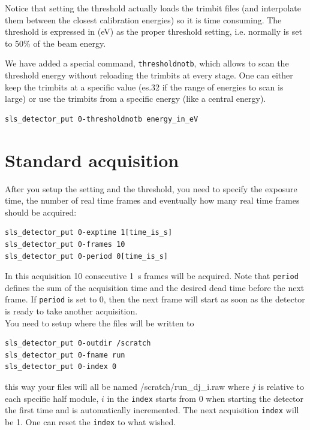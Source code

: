 \documentclass{article}
\begin{document}
Notice that setting the threshold actually loads the trimbit files (and interpolate them between the closest calibration energies) so it is time consuming. 
The threshold is expressed in (eV) as the proper threshold setting, i.e. normally is set to 50\% of the beam energy.  

We have added a special command, {\tt{thresholdnotb}}, which allows to scan the threshold energy without reloading the trimbits at every stage. One can either keep the trimbits at a specific value (es.32 if the range of energies to scan is large) or use the trimbits from a specific energy (like a central energy).
\begin{verbatim}
sls_detector_put 0-thresholdnotb energy_in_eV
\end{verbatim}

\section{Standard acquisition}

After you setup the setting and the threshold, you need to specify the exposure time, the number of real time frames and eventually how many real time frames should be acquired:
\begin{verbatim}
sls_detector_put 0-exptime 1[time_is_s]
sls_detector_put 0-frames 10
sls_detector_put 0-period 0[time_is_s]
\end{verbatim}
In this acquisition 10 consecutive 1~s frames will be acquired. Note that {\tt{period}} defines the sum of the acquisition time and the desired dead time before the next frame. If {\tt{period}} is set to 0, then the next frame will start as soon as the detector is ready to take another acquisition. \\


You need to setup where the files will be written to
\begin{verbatim}
sls_detector_put 0-outdir /scratch
sls_detector_put 0-fname run
sls_detector_put 0-index 0
\end{verbatim}
this way your files will all be named /scratch/run\_dj\_i.raw where $j$ is relative to each specific half module, $i$ in the {\tt{index}} starts from 0 when starting the detector the first time and is automatically incremented. The next acquisition {\tt{index}} will be 1. One can reset the  {\tt{index}} to what wished.
\end{document}
